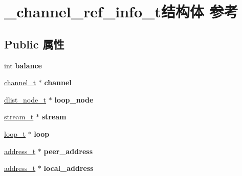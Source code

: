 \hypertarget{struct__channel__ref__info__t}{}\section{\+\_\+channel\+\_\+ref\+\_\+info\+\_\+t结构体 参考}
\label{struct__channel__ref__info__t}
\subsection*{Public 属性}
\begin{DoxyCompactItemize}
\item 
\hypertarget{struct__channel__ref__info__t_a99bd34912f0ef9a5cdacd9df9c355ce5}{}int {\bfseries balance}\label{struct__channel__ref__info__t_a99bd34912f0ef9a5cdacd9df9c355ce5}

\item 
\hypertarget{struct__channel__ref__info__t_a441b774dd529abf1712e5e69287658ba}{}\hyperlink{struct__channel__t}{channel\+\_\+t} $\ast$ {\bfseries channel}\label{struct__channel__ref__info__t_a441b774dd529abf1712e5e69287658ba}

\item 
\hypertarget{struct__channel__ref__info__t_a70fa475c90dda9133dfaa9fdcb79e958}{}\hyperlink{struct__dlist__node__t}{dlist\+\_\+node\+\_\+t} $\ast$ {\bfseries loop\+\_\+node}\label{struct__channel__ref__info__t_a70fa475c90dda9133dfaa9fdcb79e958}

\item 
\hypertarget{struct__channel__ref__info__t_a27701935d3cd7358a0b92b3495afce7f}{}\hyperlink{struct__stream__t}{stream\+\_\+t} $\ast$ {\bfseries stream}\label{struct__channel__ref__info__t_a27701935d3cd7358a0b92b3495afce7f}

\item 
\hypertarget{struct__channel__ref__info__t_a6f756b85f16f61be42aa47e79ed836a9}{}\hyperlink{struct__loop__t}{loop\+\_\+t} $\ast$ {\bfseries loop}\label{struct__channel__ref__info__t_a6f756b85f16f61be42aa47e79ed836a9}

\item 
\hypertarget{struct__channel__ref__info__t_ab97c60bda3feaabb2e1329318a7e1898}{}\hyperlink{struct__address__t}{address\+\_\+t} $\ast$ {\bfseries peer\+\_\+address}\label{struct__channel__ref__info__t_ab97c60bda3feaabb2e1329318a7e1898}

\item 
\hypertarget{struct__channel__ref__info__t_a250e85c925e44e72600c9d662c0d328d}{}\hyperlink{struct__address__t}{address\+\_\+t} $\ast$ {\bfseries local\+\_\+address}\label{struct__channel__ref__info__t_a250e85c925e44e72600c9d662c0d328d}


\end{DoxyCompactItemize}
